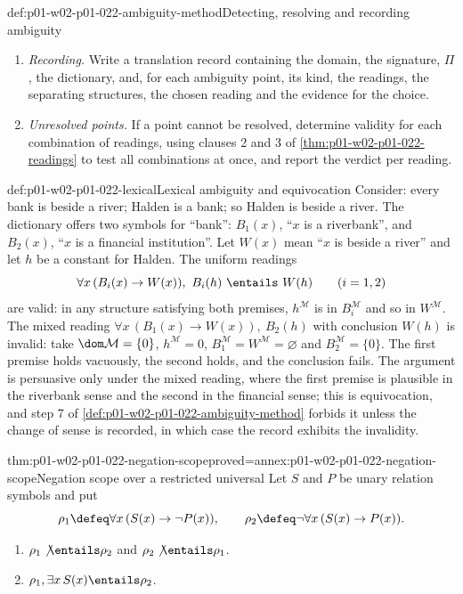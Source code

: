 \begin{hbmethod}{def:p01-w02-p01-022-ambiguity-method}{Detecting, resolving and recording ambiguity}
\begin{enumerate}
        that reading, not a reason to reject the argument. The same word is
        read in the same sense in every premise unless a change of sense is
        recorded.
  \item \emph{Recording.} Write a translation record containing the domain,
        the signature, \(\Pi\), the dictionary, and, for each ambiguity point,
        its kind, the readings, the separating structures, the chosen reading
        and the evidence for the choice.
  \item \emph{Unresolved points.} If a point cannot be resolved, determine
        validity for each combination of readings, using clauses 2 and 3 of
        \cref{thm:p01-w02-p01-022-readings} to test all combinations at once,
        and report the verdict per reading.
\end{enumerate}
\end{hbmethod}

\begin{hbexample}{def:p01-w02-p01-022-lexical}{Lexical ambiguity and equivocation}
Consider: every bank is beside a river; Halden is a bank; so Halden is
beside a river. The dictionary offers two symbols for ``bank'':
\(B_1(x)\), ``\(x\) is a riverbank'', and \(B_2(x)\), ``\(x\) is a
financial institution''. Let \(W(x)\) mean ``\(x\) is beside a river'' and
let \(h\) be a constant for Halden. The uniform readings
\[
  \forall x\,(B_i(x)\to W(x)),\ B_i(h)\ \entails\ W(h)\qquad(i=1,2)
\]
are valid: in any structure satisfying both premises, \(h^{\mathcal M}\) is
in \(B_i^{\mathcal M}\) and so in \(W^{\mathcal M}\). The mixed reading
\(\forall x\,(B_1(x)\to W(x)),\ B_2(h)\) with conclusion \(W(h)\) is invalid:
take \(\dom\mathcal M=\{0\}\), \(h^{\mathcal M}=0\),
\(B_1^{\mathcal M}=W^{\mathcal M}=\varnothing\) and
\(B_2^{\mathcal M}=\{0\}\). The first premise holds vacuously, the second
holds, and the conclusion fails. The argument is persuasive only under the
mixed reading, where the first premise is plausible in the riverbank sense
and the second in the financial sense; this is equivocation, and step 7 of
\cref{def:p01-w02-p01-022-ambiguity-method} forbids it unless the change of
sense is recorded, in which case the record exhibits the invalidity.
\end{hbexample}

\begin{hbtheorem}{thm:p01-w02-p01-022-negation-scope}{proved=annex:p01-w02-p01-022-negation-scope}{Negation scope over a restricted universal}
Let \(S\) and \(P\) be unary relation symbols and put
\[
  \rho_1\defeq\forall x\,(S(x)\to\neg P(x)),\qquad
  \rho_2\defeq\neg\forall x\,(S(x)\to P(x)).
\]
\begin{enumerate}
  \item \(\rho_1\not\entails\rho_2\) and \(\rho_2\not\entails\rho_1\).
  \item \(\rho_1,\exists x\,S(x)\entails\rho_2\).
\end{enumerate}
\end{hbtheorem}

